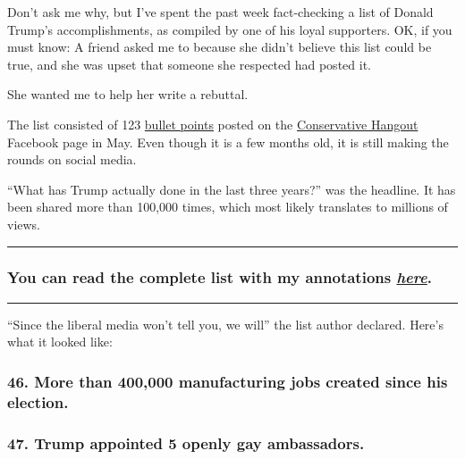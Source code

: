 Don't ask me why, but I've spent the past week fact-checking a list of
Donald Trump's accomplishments, as compiled by one of his loyal
supporters. OK, if you must know: A friend asked me to because she
didn't believe this list could be true, and she was upset that someone
she respected had posted it.

She wanted me to help her write a rebuttal.

The list consisted of 123
\href{https://www.facebookcorewwwi.onion/monroehispanic/posts/2978094428969531}{bullet
points} posted on the
\href{https://www.facebookcorewwwi.onion/Conservhangout/}{Conservative
Hangout} Facebook page in May. Even though it is a few months old, it is
still making the rounds on social media.

``What has Trump actually done in the last three years?'' was the
headline. It has been shared more than 100,000 times, which most likely
translates to millions of views.

\begin{center}\rule{0.5\linewidth}{\linethickness}\end{center}

\hypertarget{you-can-read-the-complete-list-with-my-annotations-here}{%
\subsubsection{\texorpdfstring{You can read the complete list with my
annotations
\href{https://www.nytimes3xbfgragh.onion/2020/09/11/opinion/fact-check-trump-accomplishments.html}{\emph{here}}.}{You can read the complete list with my annotations here.}}\label{you-can-read-the-complete-list-with-my-annotations-here}}

\begin{center}\rule{0.5\linewidth}{\linethickness}\end{center}

``Since the liberal media won't tell you, we will'' the list author
declared. Here's what it looked like:

\hypertarget{46-more-than-400000-manufacturing-jobs-created-since-his-election}{%
\subsubsection{46. More than 400,000 manufacturing jobs created since
his
election.}\label{46-more-than-400000-manufacturing-jobs-created-since-his-election}}

\hypertarget{47-trump-appointed-5-openly-gay-ambassadors--}{%
\subsubsection{\texorpdfstring{47. Trump appointed 5 openly gay
ambassadors. \textbf{👀
👀}}{47. Trump appointed 5 openly gay ambassadors. 👀 👀}}\label{47-trump-appointed-5-openly-gay-ambassadors--}}

